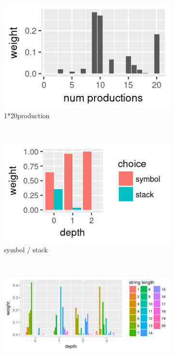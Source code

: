 \begin{figure}
    \centering
    \begin{subfigure}{0.48\textwidth}
        \includegraphics[width=\textwidth]{figures/sa-dist-prod}
        \caption{1*20production}
        \label{fig:sa-dist-prod}
    \end{subfigure}
    ~
    \begin{subfigure}{0.48\textwidth}
        \includegraphics[width=\textwidth]{figures/sa-dist-stack}
        \caption{symbol / stack}
        \label{fig:sa-dist-stack}
    \end{subfigure}
    \\
    \begin{subfigure}{0.98\textwidth}
        \includegraphics[width=\textwidth]{figures/sa-dist-strlen}

\end{subfigure}
\end{figure}
